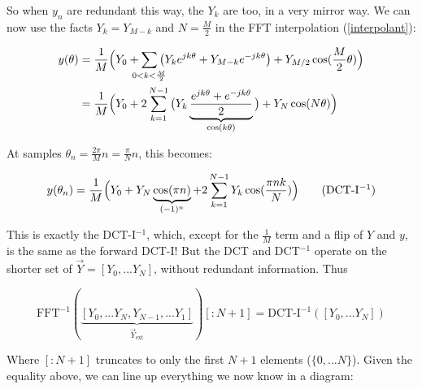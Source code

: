 \documentclass[10pt]{article}
\begin{document}
So when $y_n$ are redundant this way, the $Y_k$ are too, in a very mirror way. We can now use the facts $Y_k = Y_{M-k}$ and $N = \frac{M}{2}$ in the FFT interpolation (\autoref{interpolant}):

\begin{equation}\label{reconstruction}
\begin{aligned}
y(\theta) &= \frac{1}{M} \Big(Y_0 + \sum_{\mathclap{0 < k < \frac{M}{2}}} \big( Y_k e^{j k \theta} + Y_{M-k} e^{-j k \theta}\big) + Y_{M/2}\cos(\frac{M}{2}\theta) \Big) \\
&= \frac{1}{M} \Big(Y_0 + 2 \sum_{k = 1}^{N-1} \big( Y_k \underbrace{\frac{e^{j k \theta} + e^{-j k \theta}}{2}}_{\cos(k\theta)} \big) + Y_N\cos(N \theta) \Big)
\end{aligned}
\end{equation}

At samples $\theta_n = \frac{2\pi}{M}n = \frac{\pi}{N}n$, this becomes:

\[
y(\theta_n) = \frac{1}{M} \Big(Y_0 + Y_N\underbrace{\cos(\pi n)}_{(-1)^n} + 2 \sum_{k = 1}^{N-1} Y_k \cos(\frac{\pi nk}{N}) \Big) \tag{DCT-I$^{-1}$}
\]

This is exactly the DCT-I$^{-1}$, which, except for the $\frac{1}{M}$ term and a flip of $Y$ and $y$, is the same as the forward DCT-I! But the DCT and DCT$^{-1}$ operate on the shorter set of $\vec{Y} = [Y_0, ... Y_N]$, without redundant information. Thus

\begin{equation}\label{ifftidct}
\text{FFT}^{-1}(\underbrace{[Y_0, ... Y_N, Y_{N-1}, ... Y_1]}_{\vec{Y}_{\text{ext}}})[:\!N+1] = \text{DCT-I}^{-1}([Y_0, ... Y_N])
\end{equation}

Where $[:\!N+1]$ truncates to only the first $N+1$ elements ($\{0, ... N\}$). Given the equality above, we can line up everything we now know in a diagram:
\end{document}
